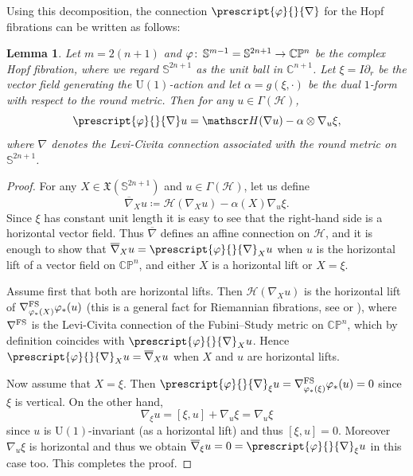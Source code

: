 \documentclass{article}
\numberwithin{equation}{section}        %
\theoremstyle{bfnote}
\newtheorem{lem}[thm]{Lemma}                %
\theoremstyle{definition}
\theoremstyle{bfremark}
\newcommand{\col}{\colon \thinspace}        %
\newcommand{\C}{\mathbb{C}}                 %
\renewcommand{\P}{\mathbb{P}}               %
\newcommand{\Sp}{\mathbb{S}}                %
\begin{document}
Using this decomposition, the connection $\prescript{\varphi}{}{\nabla}$ for the Hopf fibrations can be written as follows:

\begin{lem}    \label{lem:  nablaphicircle}
    Let $m = 2(n+1)$ and $\varphi \col \Sp^{m-1} = \Sp^{2n+1} \rightarrow \C\P^{n}$ be the complex Hopf fibration, where we regard $\Sp^{2n+1}$ as the unit ball in $\C^{n+1}$. Let $\xi = I \partial_r$ be the vector field generating the $\mathrm{U}(1)$-action and let $\alpha = g(\xi, \cdot)$ be the dual $1$-form with respect to the round metric. Then for any $u \in \Gamma(\mathscr H)$,
    \begin{equation*}
        \prescript{\varphi}{}{\nabla} u = \mathscr H(\nabla u) - \alpha \otimes \nabla_u \xi,
    \end{equation*}
    where $\nabla$ denotes the Levi-Civita connection associated with the round metric on $\Sp^{2n+1}$.
\end{lem}

\begin{proof}
    For any $X \in \mathfrak{X}(\Sp^{2n+1})$ and $u \in \Gamma(\mathscr{H})$, let us define
    \begin{equation*}
        \overline{\nabla}_X u \coloneqq \mathscr{H}(\nabla_X u) - \alpha(X) \nabla_u \xi .
    \end{equation*}
    Since $\xi$ has constant unit length it is easy to see that the right-hand side is a horizontal vector field. Thus $\overline{\nabla}$ defines an affine connection on $\mathscr H$, and it is enough to show that $\overline{\nabla}_X u = \prescript{\varphi}{}{\nabla}_X u$ when $u$ is the horizontal lift of a vector field on $\C\P^n$, and either $X$ is a horizontal lift or $X = \xi$.

    Assume first that both are horizontal lifts. Then $\mathscr H(\nabla_X u)$ is the horizontal lift of $\nabla^{\textup{FS}}_{\varphi_* (X)} \varphi_*(u)$ (this is a general fact for Riemannian fibrations, see \cite{oneil1966fundamental} or \cite[Ch. 9]{besse1987einstein}), where $\nabla^{\textup{FS}}$ is the Levi-Civita connection of the Fubini--Study metric on $\C\P^n$, which by definition coincides with $\prescript{\varphi}{}{\nabla}_X u$. Hence $\prescript{\varphi}{}{\nabla}_X u = \overline{\nabla}_X u$ when $X$ and $u$ are horizontal lifts. 

    Now assume that $X = \xi$. Then $\prescript{\varphi}{}{\nabla}_\xi u = \nabla^{\textup{FS}}_{\varphi_*(\xi)} \varphi_*(u) = 0$ since $\xi$ is vertical. On the other hand,
    \begin{equation*}
        \nabla_\xi u = [\xi,u] + \nabla_u \xi = \nabla_u \xi
    \end{equation*}
    since $u$ is $\mathrm{U}(1)$-invariant (as a horizontal lift) and thus $[\xi,u] = 0$. Moreover $\nabla_u \xi$ is horizontal and thus we obtain $\overline{\nabla}_\xi u = 0 = \prescript{\varphi}{}{\nabla}_\xi u$ in this case too. This completes the proof.
\end{proof}
\end{document}
